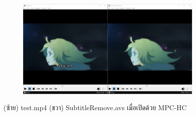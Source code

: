 \begin{figure}[H]
    \centering
    \begin{subfigure}{0.8\linewidth}
        \centering
        \includegraphics[width=1\linewidth]{image/demo_anime/result.png}
    \end{subfigure}
    \caption{(ซ้าย) test.mp4 (ขวา) SubtitleRemove.avs เมื่อเปิดด้วย MPC-HC}
\end{figure}
